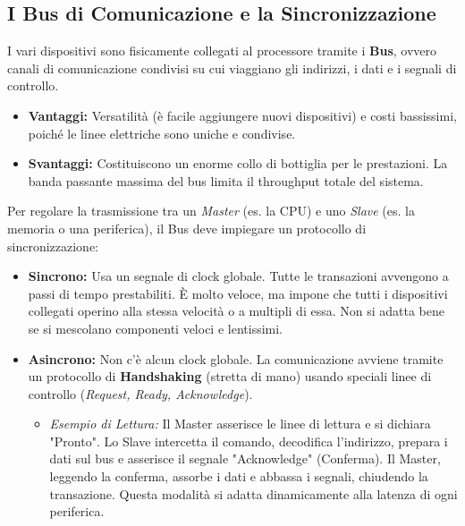 \documentclass[12pt, a4paper]{article}
\begin{document}
\subsection{I Bus di Comunicazione e la Sincronizzazione}
I vari dispositivi sono fisicamente collegati al processore tramite i \textbf{Bus}, ovvero canali di comunicazione condivisi su cui viaggiano gli indirizzi, i dati e i segnali di controllo.
\newpage
\begin{itemize}
    \item \textbf{Vantaggi:} Versatilità (è facile aggiungere nuovi dispositivi) e costi bassissimi, poiché le linee elettriche sono uniche e condivise.
    \item \textbf{Svantaggi:} Costituiscono un enorme collo di bottiglia per le prestazioni. La banda passante massima del bus limita il throughput totale del sistema.
\end{itemize}

Per regolare la trasmissione tra un \textit{Master} (es. la CPU) e uno \textit{Slave} (es. la memoria o una periferica), il Bus deve impiegare un protocollo di sincronizzazione:
\begin{itemize}
    \item \textbf{Sincrono:} Usa un segnale di clock globale. Tutte le transazioni avvengono a passi di tempo prestabiliti. È molto veloce, ma impone che tutti i dispositivi collegati operino alla stessa velocità o a multipli di essa. Non si adatta bene se si mescolano componenti veloci e lentissimi.
    \item \textbf{Asincrono:} Non c'è alcun clock globale. La comunicazione avviene tramite un protocollo di \textbf{Handshaking} (stretta di mano) usando speciali linee di controllo (\textit{Request, Ready, Acknowledge}).
    \begin{itemize}
        \item \textit{Esempio di Lettura:} Il Master asserisce le linee di lettura e si dichiara "Pronto". Lo Slave intercetta il comando, decodifica l'indirizzo, prepara i dati sul bus e asserisce il segnale "Acknowledge" (Conferma). Il Master, leggendo la conferma, assorbe i dati e abbassa i segnali, chiudendo la transazione. Questa modalità si adatta dinamicamente alla latenza di ogni periferica.
    \end{itemize}
\end{itemize}
\end{document}
